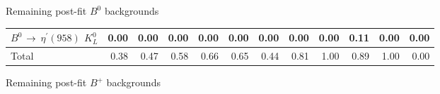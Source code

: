 \documentclass[xcolor=dvipsnames]{beamer}
\begin{document}
\begin{frame}{Remaining post-fit $B^0$ backgrounds}
{{\begin{tabular}{lrrrrrrrrrrr}
      $B^{0}$ $\rightarrow$ $\eta^{\prime}(958)$ $K_{L}^{0}$          &         0.00 &         0.00 &         0.00 &         0.00 &         0.00 &         0.00 &         0.00 &         0.00 &         0.11 &         0.00 &         0.00 \\
      \hline
      Total                                                   &         0.38 &         0.47 &         0.58 &         0.66 &         0.65 &         0.44 &         0.81 &         1.00 &         0.89 &         1.00 &         0.00 \\
      \hline
      \end{tabular}
      }}
      
   \end{frame}
\begin{frame}{Remaining post-fit $B^+$ backgrounds}
   

\end{frame}
\end{document}
